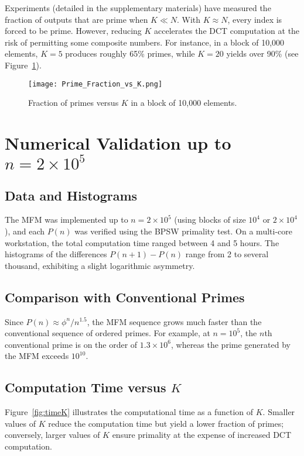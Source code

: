 \documentclass[12pt]{article}
\begin{document}
Experiments (detailed in the supplementary materials) have measured the fraction of outputs that are prime when $K\ll N$. With $K\approx N$, every index is forced to be prime. However, reducing $K$ accelerates the DCT computation at the risk of permitting some composite numbers. For instance, in a block of 10,000 elements, $K=5$ produces roughly 65\% primes, while $K=20$ yields over 90\% (see Figure~\ref{fig:fractionK}).

\begin{figure}[H]
\centering
\texttt{[image: Prime\_Fraction\_vs\_K.png]}
\caption[Fraction of primes vs. $K$]{Fraction of primes versus $K$ in a block of 10,000 elements.}
\label{fig:fractionK}
\end{figure}

\section{Numerical Validation up to \texorpdfstring{$n=2\times10^5$}{n=200000}}

\subsection{Data and Histograms}
The MFM was implemented up to $n=2\times10^5$ (using blocks of size $10^4$ or $2\times10^4$), and each $P(n)$ was verified using the BPSW primality test. On a multi-core workstation, the total computation time ranged between 4 and 5 hours. The histograms of the differences $P(n+1)-P(n)$ range from 2 to several thousand, exhibiting a slight logarithmic asymmetry.

\subsection{Comparison with Conventional Primes}
Since $P(n)\approx \phi^n/n^{1.5}$, the MFM sequence grows much faster than the conventional sequence of ordered primes. For example, at $n=10^5$, the $n$th conventional prime is on the order of $1.3\times10^6$, whereas the prime generated by the MFM exceeds $10^{10}$.

\subsection{Computation Time versus $K$}
Figure~\ref{fig:timeK} illustrates the computational time as a function of $K$. Smaller values of $K$ reduce the computation time but yield a lower fraction of primes; conversely, larger values of $K$ ensure primality at the expense of increased DCT computation.
\end{document}
